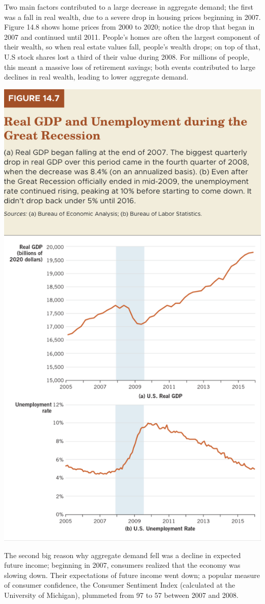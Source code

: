 \documentclass[11pt]{article} %
\begin{document}
Two main factors contributed to a large decrease in aggregate demand; the first was a fall in real wealth, due to a severe drop in housing prices beginning in 2007. Figure 14.8 shows home prices from 2000 to 2020; notice the drop that began in 2007 and continued until 2011. People's homes are often the largest component of their wealth, so when real estate values fall, people's wealth drops; on top of that, U.S stock shares lost a third of their value during 2008. For millions of people, this meant a massive loss of retirement savings; both events contributed to large declines in real wealth, leading to lower aggregate demand.

\begin{center}
\includegraphics[scale=0.4]{images/Figure 14.7.png} 
\end{center}
The second big reason why aggregate demand fell was a decline in expected future income; beginning in 2007, consumers realized that the economy was slowing down. Their expectations of future income went down; a popular measure of consumer confidence, the Consumer Sentiment Index (calculated at the University of Michigan), plummeted from 97 to 57 between 2007 and 2008.
\end{document}

